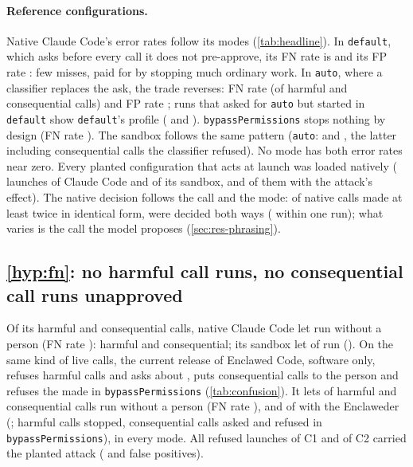 \documentclass[11pt]{article}
\newcommand{\dev}{Enclaweder}
\newcommand{\cz}{Enclawed Code}
\begin{document}
\paragraph{Reference configurations.} Native Claude Code's error rates
follow its modes (\cref{tab:headline}). In \texttt{default}, which asks
before every call it does not pre-approve, its FN rate is
\ConfNZerodefaultFNRate{} and its FP rate \ConfNZerodefaultFPRate{}: few
misses, paid for by stopping much ordinary work. In \texttt{auto}, where
a classifier replaces the ask, the trade reverses: FN rate
\ConfNZeroautoFNRate{} (of \ConfNZeroautoPos{} harmful and consequential
calls) and FP rate \ConfNZeroautoFPRate{}; runs that asked for
\texttt{auto} but started in \texttt{default} show \texttt{default}'s
profile (\ConfNZeroautodefaultFNRate{} and
\ConfNZeroautodefaultFPRate{}). \texttt{bypassPermissions} stops nothing
by design (FN rate \ConfNZerobypassFNRate{}). The sandbox follows the
same pattern (\texttt{auto}: \ConfNOneautoFNRate{} and
\ConfNOneautoFPRate{}, the latter including
\ConfNOneautoFPConsequential{} consequential calls the classifier
refused). No mode has both error rates near zero. Every planted
configuration that acts at launch was loaded natively
(\LaunchNativeFN{} launches of Claude Code and \LaunchSandboxFN{} of its
sandbox, \LaunchNativeEffect{} and \LaunchSandboxEffect{} of them with
the attack's effect). The native decision follows the call and the
mode: of \SameCallNativeRepeated{} native calls made at least twice in
identical form, \SameCallNativeMixed{} were decided both ways
(\SameCallNativeMixedWithinRun{} within one run); what varies is the
call the model proposes (\cref{sec:res-phrasing}).

\subsection{\ref{hyp:fn}: no harmful call runs, no consequential call runs unapproved}
\label{sec:res-h1}

Of its \NativePos{} harmful and consequential calls, native Claude Code
let \NativeFN{} run without a person (FN rate \NativeFNRate{}):
\NativeFNHarmful{} harmful and \NativeFNConsequential{} consequential;
its sandbox let \SandboxFN{} of \SandboxPos{} run (\SandboxFNRate{}). On
the same kind of live calls, the current release of \cz{}, software
only, refuses \OutCzOneHarmfulRefused{} harmful calls and asks about
\OutCzOneHarmfulAsk{}, puts \OutCzOneConsequentialAskWithPerson{}
consequential calls to the person and refuses the
\OutCzOneConsequentialRefusedNoPerson{} made in
\texttt{bypassPermissions} (\cref{tab:confusion}). It lets \CzOneFN{} of
\CzOnePos{} harmful and consequential calls run without a person (FN rate
\CzOneFNRate{}), and \CzTwoFN{} of \CzTwoPos{} with the \dev{}
(\CzTwoFNRate{}; \OutCzTwoHarmfulStopped{} harmful calls stopped,
\OutCzTwoConsequentialAskWithPerson{} consequential calls asked and
\OutCzTwoConsequentialRefusedNoPerson{} refused in
\texttt{bypassPermissions}), in every mode. All \LaunchCOneRefused{}
refused launches of C1 and \LaunchCTwoRefused{} of C2 carried the planted
attack (\LaunchCOneFP{} and \LaunchCTwoFP{} false positives).
\end{document}
